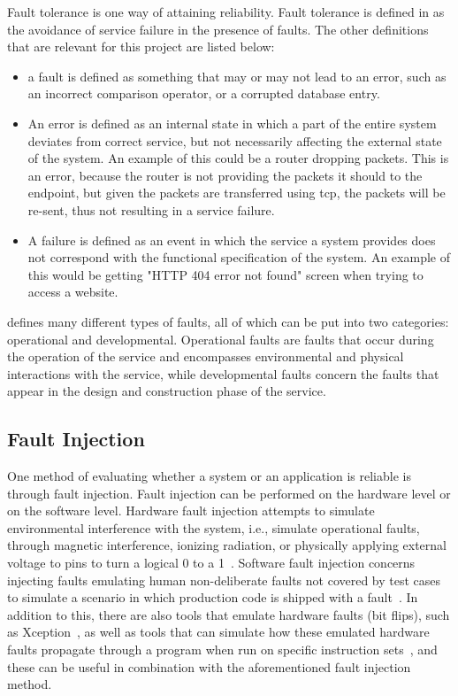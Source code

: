  Fault tolerance is one way of attaining reliability. Fault tolerance is defined in \citet{avizienis2004basic} as the avoidance of service failure in the presence of faults. The other definitions that are relevant for this project are listed below: 
 
 \begin{itemize}
     \item a fault is defined as something that may or may not lead to an error, such as an incorrect comparison operator, or a corrupted database entry. 
     \item An error is defined as an internal state in which a part of the entire system deviates from correct service, but not necessarily affecting the external state of the system. An example of this could be a router dropping packets. This is an error, because the router is not providing the packets it should to the endpoint, but given the packets are transferred using tcp, the packets will be re-sent, thus not resulting in a service failure. 
     \item A failure is defined as an event in which the service a system provides does not correspond with the functional specification of the system. An example of this would be getting "HTTP 404 error not found" screen when trying to access a website.
 \end{itemize}
 
\citet{avizienis2004basic} defines many different types of faults, all of which can be put into two categories: operational and developmental. Operational faults are faults that occur during the operation of the service and encompasses environmental and physical interactions with the service, while developmental faults concern the faults that appear in the design and construction phase of the service. 

\subsection{Fault Injection}
One method of evaluating whether a system or an application is reliable is through fault injection. Fault injection can be performed on the hardware level or on the software level. Hardware fault injection attempts to simulate environmental interference with the system, i.e., simulate operational faults, through magnetic interference, ionizing radiation, or physically applying external voltage to pins to turn a logical 0 to a 1~\citep{arlat1993fault}. Software fault injection concerns injecting faults emulating human non-deliberate faults not covered by test cases to simulate a scenario in which production code is shipped with a fault~\citep{natella2012fault}. 
In addition to this, there are also tools that emulate hardware faults (bit flips), such as Xception~\citep{carreira1998xception}, as well as tools that can simulate how these emulated hardware faults propagate through a program when run on specific instruction sets~\citep{venkatagiri2019gem5}, and these can be useful in combination with the aforementioned fault injection method. 


